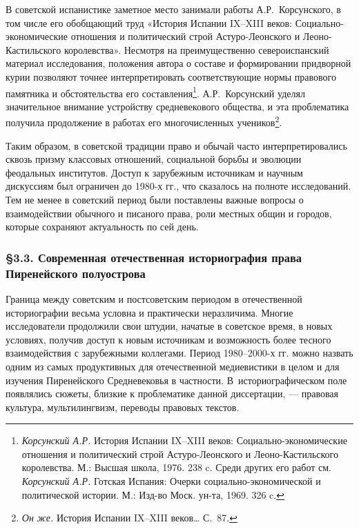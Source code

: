 В советской испанистике заметное место занимали работы А.Р.~Корсунского, в том числе его обобщающий труд «История Испании IX--XIII веков: Социально-экономические отношения и политический строй Астуро-Леонского и Леоно-Кастильского королевства». Несмотря на преимущественно североиспанский материал исследования, положения автора о составе и формировании придворной курии позволяют точнее интерпретировать соответствующие нормы правового памятника и обстоятельства его составления\footnote{\emph{Корсунский А.Р.} История Испании IX--XIII веков: Социально-экономические отношения и политический строй Астуро-Леонского и Леоно-Кастильского королевства. М.: Высшая школа, 1976. 238 c. Среди других его работ см. \emph{Корсунский А.Р.} Готская Испания: Очерки социально-экономической и политической истории. М.: Изд-во Моск. ун-та, 1969. 326 c.}. А.Р.~Корсунский уделял значительное внимание устройству средневекового общества, и эта проблематика получила продолжение в работах его многочисленных учеников\footnote{\emph{Он же.} История Испании IX--XIII веков… С.~87.}.

Таким образом, в советской традиции право и обычай часто интерпретировались сквозь призму классовых отношений, социальной борьбы и эволюции феодальных институтов. Доступ к зарубежным источникам и научным дискуссиям был ограничен до 1980-х гг., что сказалось на полноте исследований. Тем не менее в советский период были поставлены важные вопросы о взаимодействии обычного и писаного права, роли местных общин и городов, которые сохраняют актуальность по сей день.

\subsubsection*{§3.3. Современная отечественная историография права Пиренейского полуострова}

Граница между советским и постсоветским периодом в отечественной историографии весьма условна и практически неразличима. Многие исследователи продолжили свои штудии, начатые в советское время, в новых условиях, получив доступ к новым источникам и возможность более тесного взаимодействия с зарубежными коллегами. Период 1980--2000-х гг. можно назвать одним из самых продуктивных для отечественной медиевистики в целом и для изучения Пиренейского Средневековья в частности. В~историографическом поле появлялись сюжеты, близкие к проблематике данной диссертации, --- правовая культура, мультилингвизм, переводы правовых текстов.

